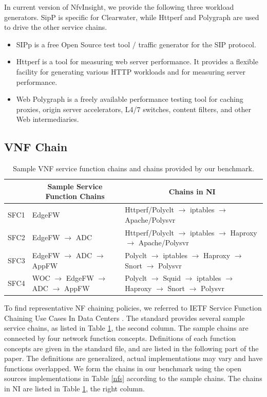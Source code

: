 In current version of NfvInsight, we provide the following three workload generators.
SipP is specific for Clearwater,
while Httperf and Polygraph are used to drive the other service chains.
\begin{itemize}
\item{}
SIPp \cite{SIPp}
is a free Open Source test tool / traffic generator for the SIP protocol.
\item{}
Httperf \cite{Httperf}
is a tool for measuring web server performance. It provides a flexible facility for generating various HTTP workloads and for measuring server performance.
\item{}
Web Polygraph \cite{web-polygraph}
is a freely available performance testing tool for caching proxies, origin server accelerators, L4/7 switches, content filters, and other Web intermediaries.
\end{itemize}

\subsection{VNF Chain}

\begin{table}[!t]
\newcommand{\tabincell}[2]{\begin{tabular}{@{}#1@{}}#2\end{tabular}}
\centering
\begin{tabular}{|l|l|l|}\hline
\textbf{} & \multicolumn{1}{c|}{\textbf{Sample Service Function Chains}} & \multicolumn{1}{c|}{\textbf{Chains in NI}} \\\hline
SFC1 & EdgeFW & Httperf/Polyclt $\to$ iptables $\to$ Apache/Polysvr \\\hline
SFC2 & EdgeFW $\to$ ADC & Httperf/Polyclt $\to$ iptables $\to$ Haproxy $\to$ Apache/Polysvr \\\hline
SFC3 & EdgeFW $\to$ ADC $\to$ AppFW & Polyclt $\to$ iptables $\to$ Haproxy $\to$ Snort $\to$ Polysvr \\\hline
SFC4 & WOC $\to$ EdgeFW $\to$ ADC $\to$ AppFW & Polyclt $\to$  Squid $\to$ iptables $\to$ Haproxy $\to$ Snort $\to$ Polysvr \\\hline
\end{tabular}
\caption{Sample VNF service function chains and chains provided by our benchmark.}
\label{chains}
\end{table}

To find representative NF chaining policies,
we referred to IETF Service Function Chaining Use Cases
In Data Centers \cite{draft-ietf-sfc-dc-use-cases-06}.
The standard provides several sample service chains,
as listed in Table \ref{chains}, the second column.
The sample chains are connected by four network function concepts.
Definitions of each function concepts are given in the standard file,
and are listed in the following part of the paper.
The definitions are generalized,
actual implementations may vary and have functions overlapped.
We form the chains in our benchmark using the open sources
implementations in Table \ref{nfs} according to the sample chains.
The chains in NI are listed in Table \ref{chains}, the right column.

